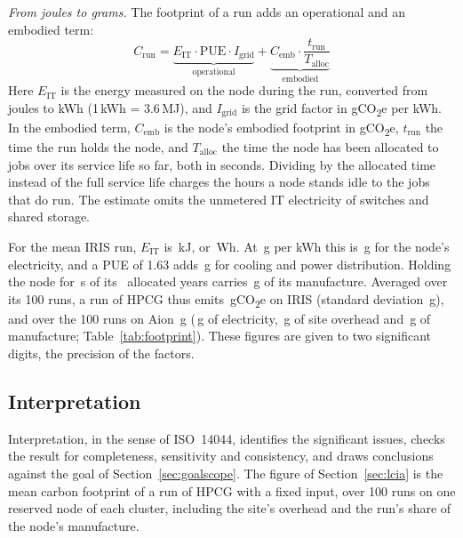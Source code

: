 \documentclass[conference,a4paper]{IEEEtran}
\begin{document}
\emph{From joules to grams.} The footprint of a run adds an operational and an
embodied term:
\begin{equation*}
C_{\text{run}} = \underbrace{E_{\text{IT}} \cdot \text{PUE} \cdot
I_{\text{grid}}}_{\text{operational}} +
\underbrace{C_{\text{emb}} \cdot \frac{t_{\text{run}}}{T_{\text{alloc}}}}_{\text{embodied}}
\end{equation*}
Here $E_{\text{IT}}$ is the energy measured on the node during the run, converted
from joules to kWh (1\,kWh = 3.6\,MJ), and $I_{\text{grid}}$ is the grid factor
in gCO\textsubscript{2}e per kWh. In the embodied term, $C_{\text{emb}}$ is the
node's embodied footprint in gCO\textsubscript{2}e, $t_{\text{run}}$ the time
the run holds the node, and $T_{\text{alloc}}$ the time the node has been
allocated to jobs over its service life so far, both in seconds. Dividing by the allocated
time instead of the full service life charges the hours a node stands idle to
the jobs that do run. The estimate omits the unmetered IT electricity of
switches and shared storage.

For the mean IRIS run, $E_{\text{IT}}$ is \IrisEnergy\,kJ, or
\IrisEnergyWh\,Wh. At \Grid\,g per kWh this is \IrisGNode\,g for the node's
electricity, and a PUE of 1.63 adds \IrisGSite\,g for cooling and power
distribution. Holding the node for \IrisTime\,s of its \IrisTalloc\ allocated
years carries \IrisGEmb\,g of its manufacture. Averaged over its 100 runs, a run
of HPCG thus emits \IrisGrams\,gCO\textsubscript{2}e on IRIS (standard deviation
\IrisGramsSd\,g), and over the 100 runs on Aion \AionGrams\,g (\AionGNode\,g of
electricity, \AionGSite\,g of site overhead and \AionGEmb\,g of manufacture;
Table~\ref{tab:footprint}). These figures are given to two significant digits,
the precision of the factors.

\subsection{Interpretation}\label{sec:interpretation}

Interpretation, in the sense of ISO~14044, identifies the significant issues,
checks the result for completeness, sensitivity and consistency, and draws
conclusions against the goal of Section~\ref{sec:goalscope}. The figure of
Section~\ref{sec:lcia} is the mean carbon footprint of a run of HPCG with a
fixed input, over 100 runs on one reserved node of each cluster, including the
site's overhead and the run's share of the node's manufacture.
\end{document}
